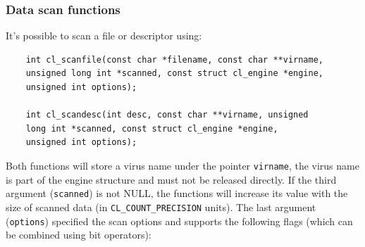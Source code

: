 \documentclass[a4paper,titlepage,12pt]{article}
\begin{document}
    \subsubsection{Data scan functions}
    It's possible to scan a file or descriptor using:
    \begin{verbatim}
	int cl_scanfile(const char *filename, const char **virname,
	unsigned long int *scanned, const struct cl_engine *engine,
	unsigned int options);

	int cl_scandesc(int desc, const char **virname, unsigned
	long int *scanned, const struct cl_engine *engine,
	unsigned int options);
    \end{verbatim}
    Both functions will store a virus name under the pointer \verb+virname+,
    the virus name is part of the engine structure and must not be released
    directly. If the third argument (\verb+scanned+) is not NULL, the
    functions will increase its value with the size of scanned data (in
    \verb+CL_COUNT_PRECISION+ units).
    The last argument (\verb+options+) specified the scan options and supports
    the following flags (which can be combined using bit operators):
\end{document}
